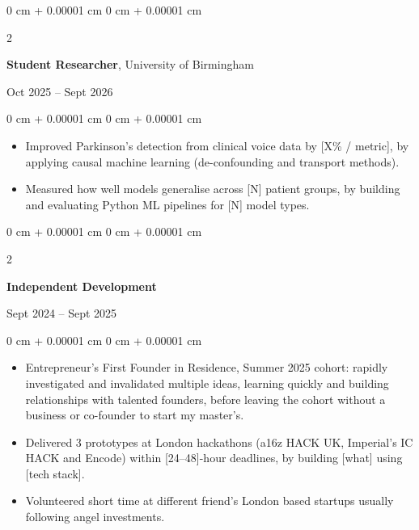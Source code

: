 \documentclass[10pt, letterpaper]{article}
\newenvironment{highlights}{
    \begin{itemize}[
        topsep=0.10 cm,
        parsep=0pt,
        partopsep=0pt,
        itemsep=0pt,
        leftmargin=0 cm + 10pt
    ]
}{
    \end{itemize}
}
\newenvironment{onecolentry}{
    \begin{adjustwidth}{
        0 cm + 0.00001 cm
    }{
        0 cm + 0.00001 cm
    }
}{
    \end{adjustwidth}
}
\newenvironment{twocolentry}[2][]{
    \onecolentry
    \def\secondColumn{#2}
    \setcolumnwidth{\fill, 4.5 cm}
    \begin{paracol}{2}
}{
    \switchcolumn \raggedleft \secondColumn
    \end{paracol}
    \endonecolentry
}
\begin{document}
\vspace{0.2 cm}

\begin{twocolentry}{
    Oct 2025 -- Sept 2026
}
    \textbf{Student Researcher}, University of Birmingham
\end{twocolentry}

\vspace{0.10 cm}

\begin{onecolentry}
    \begin{highlights}
        \item Improved Parkinson's detection from clinical voice data by [X\% / metric], by applying causal machine learning (de-confounding and transport methods).
        \item Measured how well models generalise across [N] patient groups, by building and evaluating Python ML pipelines for [N] model types.
    \end{highlights}
\end{onecolentry}

\vspace{0.2 cm}

\begin{twocolentry}{
    Sept 2024 -- Sept 2025
}
    \textbf{Independent Development}
\end{twocolentry}

\vspace{0.10 cm}

\begin{onecolentry}
    \begin{highlights}
        \item Entrepreneur's First Founder in Residence, Summer 2025 cohort: rapidly investigated and invalidated multiple ideas, learning quickly and building relationships with talented founders, before leaving the cohort without a business or co-founder to start my master's.
        \item Delivered 3 prototypes at London hackathons (a16z HACK UK, Imperial's IC HACK and Encode) within [24--48]-hour deadlines, by building [what] using [tech stack].
        \item Volunteered short time at different friend's London based startups usually following angel investments.
    \end{highlights}
\end{onecolentry}

\vspace{0.2 cm}
\end{document}
